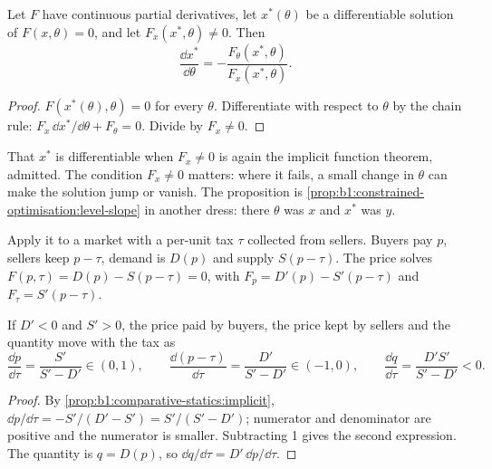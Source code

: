 \begin{proposition}\label{prop:b1:comparative-statics:implicit}
Let $F$ have continuous partial derivatives, let $x^*(\theta)$ be a
differentiable solution of $F(x, \theta) = 0$, and let
$F_x(x^*, \theta) \neq 0$. Then
\[
\frac{\dd x^*}{\dd\theta} = -\frac{F_\theta(x^*, \theta)}{F_x(x^*, \theta)} .
\]
\end{proposition}

\begin{proof}
$F(x^*(\theta), \theta) = 0$ for every $\theta$. Differentiate with respect to
$\theta$ by the chain rule: $F_x \,\dd x^*/\dd\theta + F_\theta = 0$. Divide by
$F_x \neq 0$.
\end{proof}

That $x^*$ is differentiable when $F_x \neq 0$ is again the implicit
function theorem, admitted. The condition $F_x \neq 0$ matters: where it
fails, a small change in $\theta$ can make the solution jump or vanish. The
proposition is \cref{prop:b1:constrained-optimisation:level-slope} in
another dress: there $\theta$ was $x$ and $x^*$ was $y$.

Apply it to a market with a per-unit tax $\tau$ collected from sellers.
Buyers pay $p$, sellers keep $p - \tau$, demand is $D(p)$ and supply
$S(p - \tau)$. The  price solves $F(p, \tau) = D(p) - S(p - \tau) =
0$, with $F_p = D'(p) - S'(p - \tau)$ and $F_\tau = S'(p - \tau)$.

\begin{proposition}\label{prop:b1:comparative-statics:incidence}
If $D' < 0$ and $S' > 0$, the price paid by buyers, the price kept by
sellers and the quantity move with the tax as
\[
\frac{\dd p}{\dd\tau} = \frac{S'}{S' - D'} \in (0, 1), \qquad
\frac{\dd (p - \tau)}{\dd\tau} = \frac{D'}{S' - D'} \in (-1, 0), \qquad
\frac{\dd q}{\dd\tau} = \frac{D' S'}{S' - D'} < 0 .
\]
\end{proposition}

\begin{proof}
By \cref{prop:b1:comparative-statics:implicit},
$\dd p/\dd\tau = -S'/(D' - S') = S'/(S' - D')$; numerator and denominator
are positive and the numerator is smaller. Subtracting 1 gives the second
expression. The quantity is $q = D(p)$, so $\dd q/\dd\tau = D' \,\dd p/\dd\tau$.
\end{proof}


